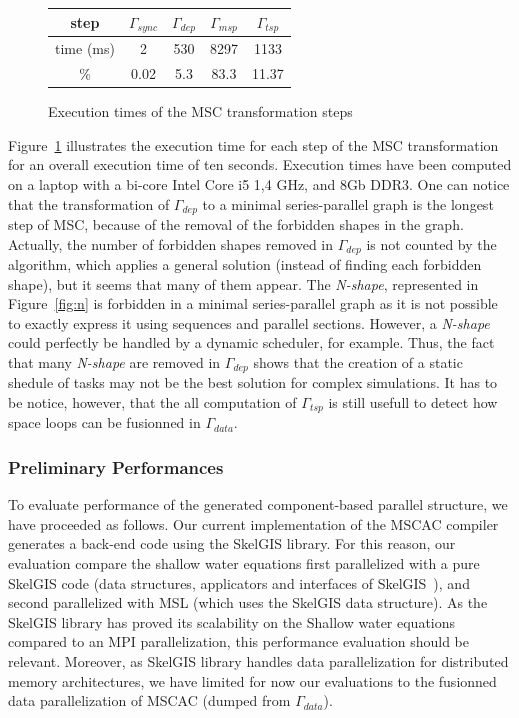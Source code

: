 \begin{figure}[!h]
 \begin{center}
 \begin{tabular}{c|c|c|c|c|}
   step & $\Gamma_{sync}$ & $\Gamma_{dep}$ & $\Gamma_{msp}$ & $\Gamma_{tsp}$\\
   \hline
   time (ms) & 2 & 530 & 8297 & 1133\\
   \hline
   \% & 0.02 & 5.3 & 83.3 & 11.37\\
 \end{tabular}
\caption{Execution times of the MSC transformation steps}
\label{fig:exectime}
 \end{center}
\end{figure}

Figure~\ref{fig:exectime} illustrates the execution time for each step of the MSC transformation for an overall execution time of ten seconds. Execution times have been computed on a laptop with a bi-core Intel Core i5 1,4 GHz, and 8Gb DDR3. 
One can notice that the transformation of $\Gamma_{dep}$ to a minimal series-parallel graph is the longest step of MSC, because of the removal of the forbidden shapes in the graph. Actually, the number of forbidden shapes removed in $\Gamma_{dep}$ is not counted by the algorithm, which applies a general solution (instead of finding each forbidden shape), but it seems that many of them appear. The \emph{N-shape}, represented in Figure~\ref{fig:n} is forbidden in a minimal series-parallel graph as it is not possible to exactly express it using sequences and parallel sections. However, a \emph{N-shape} could perfectly be handled by a dynamic scheduler, for example.
Thus, the fact that many \emph{N-shape} are removed in $\Gamma_{dep}$ shows that the creation of a static shedule of tasks may not be the best solution for complex simulations. It has to be notice, however, that the all computation of $\Gamma_{tsp}$ is still usefull to detect how space loops can be fusionned in $\Gamma_{data}$.

\subsubsection*{Preliminary Performances}
To evaluate performance of the generated component-based parallel structure, we have proceeded as follows. Our current implementation of the MSCAC compiler generates a back-end code using the SkelGIS library. For this reason, our evaluation compare the shallow water equations first parallelized with a pure SkelGIS code (data structures, applicators and interfaces of SkelGIS~\cite{CPE:CPE3494}), and second parallelized with MSL (which uses the SkelGIS data structure). As the SkelGIS library has proved its scalability on the Shallow water equations compared to an MPI parallelization, this performance evaluation should be relevant. 
Moreover, as SkelGIS library handles data parallelization for distributed memory architectures, we have limited for now our evaluations to the fusionned data parallelization of MSCAC (dumped from $\Gamma_{data}$). 

